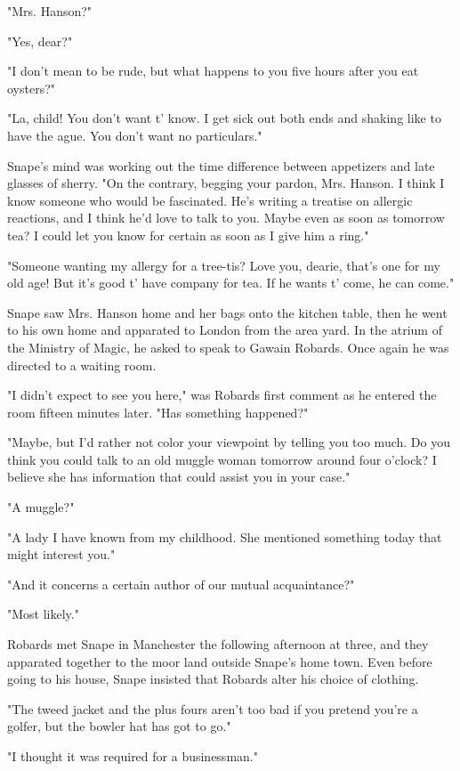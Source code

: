 \documentclass[a4paper,11pt]{article}
\begin{document}
"Mrs. Hanson?"

"Yes, dear?"

"I don't mean to be rude, but what happens to you five hours after you eat oysters?"

"La, child! You don't want t' know. I get sick out both ends and shaking like to have the ague. You don't want no particulars."

Snape's mind was working out the time difference between appetizers and late glasses of sherry. "On the contrary, begging your pardon, Mrs. Hanson. I think I know someone who would be fascinated. He's writing a treatise on allergic reactions, and I think he'd love to talk to you. Maybe even as soon as tomorrow tea? I could let you know for certain as soon as I give him a ring."

"Someone wanting my allergy for a tree-tis? Love you, dearie, that's one for my old age! But it's good t' have company for tea. If he wants t' come, he can come."

Snape saw Mrs. Hanson home and her bags onto the kitchen table, then he went to his own home and apparated to London from the area yard. In the atrium of the Ministry of Magic, he asked to speak to Gawain Robards. Once again he was directed to a waiting room.

"I didn't expect to see you here," was Robards first comment as he entered the room fifteen minutes later. "Has something happened?"

"Maybe, but I'd rather not color your viewpoint by telling you too much. Do you think you could talk to an old muggle woman tomorrow around four o'clock? I believe she has information that could assist you in your case."

"A muggle?"

"A lady I have known from my childhood. She mentioned something today that might interest you."

"And it concerns a certain author of our mutual acquaintance?"

"Most likely."

Robards met Snape in Manchester the following afternoon at three, and they apparated together to the moor land outside Snape's home town. Even before going to his house, Snape insisted that Robards alter his choice of clothing.

"The tweed jacket and the plus fours aren't too bad if you pretend you're a golfer, but the bowler hat has got to go."

"I thought it was required for a businessman."
\end{document}
